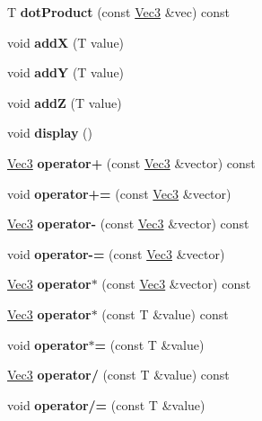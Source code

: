 \begin{DoxyCompactItemize}
\mbox{\label{classVec3_a7f9293fb3fe544150d369f79b7068561}} 
T {\bfseries dot\+Product} (const \mbox{\hyperlink{classVec3}{Vec3}} \&vec) const
\item 
\mbox{\label{classVec3_a62a51e17139ac62fde2a8e764b423aa5}} 
void {\bfseries addX} (T value)
\item 
\mbox{\label{classVec3_acedfa1c9f7193c47271c53dd08f883bc}} 
void {\bfseries addY} (T value)
\item 
\mbox{\label{classVec3_a7e31142017c656f7a8a20aa27641334d}} 
void {\bfseries addZ} (T value)
\item 
\mbox{\label{classVec3_ad648937145b298fa1f018143d34c56e9}} 
void {\bfseries display} ()
\item 
\mbox{\label{classVec3_a29ad82d16019c0fa88cb4d2533188e91}} 
\mbox{\hyperlink{classVec3}{Vec3}} {\bfseries operator+} (const \mbox{\hyperlink{classVec3}{Vec3}} \&vector) const
\item 
\mbox{\label{classVec3_a500dc9307709f76f8c8dd8cdbb5eb729}} 
void {\bfseries operator+=} (const \mbox{\hyperlink{classVec3}{Vec3}} \&vector)
\item 
\mbox{\label{classVec3_a61f886111d68ad30d590e0e852e504dc}} 
\mbox{\hyperlink{classVec3}{Vec3}} {\bfseries operator-\/} (const \mbox{\hyperlink{classVec3}{Vec3}} \&vector) const
\item 
\mbox{\label{classVec3_a0e189b4d60af3a7ed7fc4b66ce842314}} 
void {\bfseries operator-\/=} (const \mbox{\hyperlink{classVec3}{Vec3}} \&vector)
\item 
\mbox{\label{classVec3_a7758e59e0a1fa7a98cfa04729cd1209e}} 
\mbox{\hyperlink{classVec3}{Vec3}} {\bfseries operator$\ast$} (const \mbox{\hyperlink{classVec3}{Vec3}} \&vector) const
\item 
\mbox{\label{classVec3_a4b1c79f37e0551af037eb15075316786}} 
\mbox{\hyperlink{classVec3}{Vec3}} {\bfseries operator$\ast$} (const T \&value) const
\item 
\mbox{\label{classVec3_a2c0d79315c313547c607f8b59a498b50}} 
void {\bfseries operator$\ast$=} (const T \&value)
\item 
\mbox{\label{classVec3_a9a8948fb295a532a54450e45b9bf3b8d}} 
\mbox{\hyperlink{classVec3}{Vec3}} {\bfseries operator/} (const T \&value) const
\item 
\mbox{\label{classVec3_a5a71e64e02e97ee191354b153800f3ff}} 
void {\bfseries operator/=} (const T \&value)
\end{DoxyCompactItemize}
